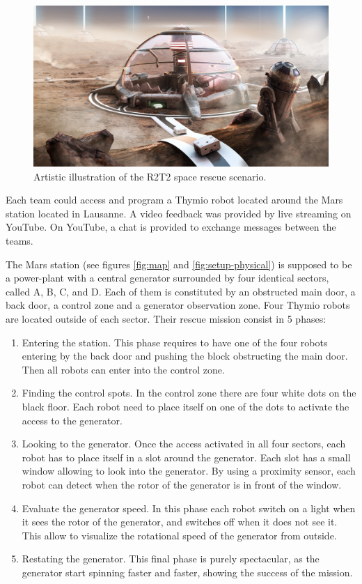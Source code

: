 \documentclass{intech-journal}
\begin{document}
\begin{figure}[ht]
 \centering
    \includegraphics[width=0.7\columnwidth]{figures/r2t2_illu.jpg}
  \caption{Artistic illustration of the R2T2 space rescue scenario.}
  \label{fig:illustration} 
\end{figure}

Each team could access and program a Thymio robot located around the Mars station located in Lausanne. 
A video feedback was provided by live streaming on YouTube. 
On YouTube, a chat is provided to exchange messages between the teams.

The Mars station (see figures \ref{fig:map} and \ref{fig:setup-physical}) is supposed to be a power-plant with a central generator surrounded by four identical sectors, called A, B, C, and D.
Each of them is constituted by an obstructed main door, a back door, a control zone and a generator observation zone.
Four Thymio robots are located outside of each sector. 
Their rescue mission consist in 5 phases:
\begin{enumerate}
\item Entering the station. This phase requires to have one of the four robots entering by the back door and pushing the block obstructing the main door. Then all robots can enter into the control zone.
\item Finding the control spots. In the control zone there are four white dots on the black floor. Each robot need to place itself on one of the dots to activate the access to the generator.
\item Looking to the generator. Once the access activated in all four sectors, each robot has to place itself in a slot around the generator. Each slot has a small window allowing to look into the generator. By using a proximity sensor, each robot can detect when the rotor of the generator is in front of the window.
\item Evaluate the generator speed. In this phase each robot switch on a light when it sees the rotor of the generator, and switches off when it does not see it. This allow to visualize the rotational speed of the generator from outside.
\item Restating the generator. This final phase is purely spectacular, as the generator start spinning faster and faster, showing the success of the mission.
\end{enumerate}
\end{document}
